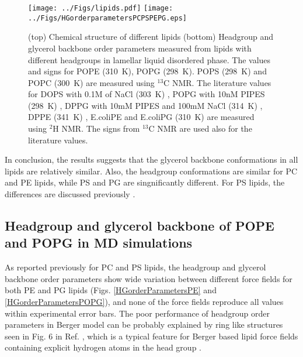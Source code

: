 \documentclass[aps,prl,superscriptaddress,twocolumn]{revtex4}
\begin{document}
\begin{figure}[]
  \centering
  \texttt{[image: ../Figs/lipids.pdf]}
  \texttt{[image: ../Figs/HGorderparametersPCPSPEPG.eps]}
  \caption{\label{HGorderParameters}
    (top) Chemical structure of different lipids
    (bottom) Headgroup and glycerol backbone order parameters measured from lipids
    with different headgroups in lamellar liquid disordered phase.
    The values and signs for POPE (310~K), POPG (298~K). POPS (298~K) \cite{NMRlipidsIVps} and POPC (300~K) \cite{ferreira13,ferreira16}
    are measured using $^{13}$C NMR. The literature values for
    DOPS with 0.1M of NaCl (303~K) \cite{browning80},
    POPG with 10nM PIPES (298~K) \cite{borle85},
    DPPG with 10mM PIPES and 100mM NaCl (314~K) \cite{wohlgemuth80}, 
    DPPE (341~K) \cite{seelig76},
    E.coliPE and E.coliPG (310~K) \cite{gally81}
    are measured using $^2$H NMR. The signs from $^{13}$C NMR are used also for the literature values.
  }
\end{figure}

In conclusion, the results suggests that the glycerol backbone conformations in all lipids are
relatively similar. Also, the headgroup conformations are similar for PC and PE lipids, while
PS and PG are singnificantly different. For PS lipids, the differences are discussed previously \cite{??}.

\subsection{Headgroup and glycerol backbone of POPE and POPG in MD simulations}
As reported previously for PC \cite{botan15} and PS \cite{NMRlipidsIVps} lipids,
the headgroup and glycerol backbone order parameters show wide variation between different force fields
for both PE and PG lipids (Figs. \ref{HGorderParametersPE} and \ref{HGorderParametersPOPG}),
and none of the force fields reproduce all values within experimental error bars.
The poor performance of headgroup order parameters in Berger model can be probably explained by ring like structures seen in Fig. 6 in Ref. ,
which is a typical feature for Berger based lipid force fields containing explicit hydrogen atoms in the head group \cite{zhao08,henin09,dahlberg10}.
\end{document}
